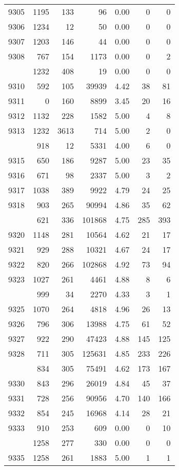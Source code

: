 \documentclass[
]{article}
\begin{document}
\begin{table}
\begin{tabular}[t]{lrrrrrr}
9305 & 1195 & 133 & 96 & 0.00 & 0 & 0\\
9306 & 1234 & 12 & 50 & 0.00 & 0 & 0\\
9307 & 1203 & 146 & 44 & 0.00 & 0 & 0\\
9308 & 767 & 154 & 1173 & 0.00 & 0 & 2\\
\addlinespace
9309 & 1232 & 408 & 19 & 0.00 & 0 & 0\\
9310 & 592 & 105 & 39939 & 4.42 & 38 & 81\\
9311 & 0 & 160 & 8899 & 3.45 & 20 & 16\\
9312 & 1132 & 228 & 1582 & 5.00 & 4 & 8\\
9313 & 1232 & 3613 & 714 & 5.00 & 2 & 0\\
\addlinespace
9314 & 918 & 12 & 5331 & 4.00 & 6 & 0\\
9315 & 650 & 186 & 9287 & 5.00 & 23 & 35\\
9316 & 671 & 98 & 2337 & 5.00 & 3 & 2\\
9317 & 1038 & 389 & 9922 & 4.79 & 24 & 25\\
9318 & 903 & 265 & 90994 & 4.86 & 35 & 62\\
\addlinespace
9319 & 621 & 336 & 101868 & 4.75 & 285 & 393\\
9320 & 1148 & 281 & 10564 & 4.62 & 21 & 17\\
9321 & 929 & 288 & 10321 & 4.67 & 24 & 17\\
9322 & 820 & 266 & 102868 & 4.92 & 73 & 94\\
9323 & 1027 & 261 & 4461 & 4.88 & 8 & 6\\
\addlinespace
9324 & 999 & 34 & 2270 & 4.33 & 3 & 1\\
9325 & 1070 & 264 & 4818 & 4.96 & 26 & 13\\
9326 & 796 & 306 & 13988 & 4.75 & 61 & 52\\
9327 & 922 & 290 & 47423 & 4.88 & 145 & 125\\
9328 & 711 & 305 & 125631 & 4.85 & 233 & 226\\
\addlinespace
9329 & 834 & 305 & 75491 & 4.62 & 173 & 167\\
9330 & 843 & 296 & 26019 & 4.84 & 45 & 37\\
9331 & 728 & 256 & 90956 & 4.70 & 140 & 166\\
9332 & 854 & 245 & 16968 & 4.14 & 28 & 21\\
9333 & 910 & 253 & 609 & 0.00 & 0 & 10\\
\addlinespace
9334 & 1258 & 277 & 330 & 0.00 & 0 & 0\\
9335 & 1258 & 261 & 1883 & 5.00 & 1 & 1\\

\end{tabular}
\end{table}
\end{document}
